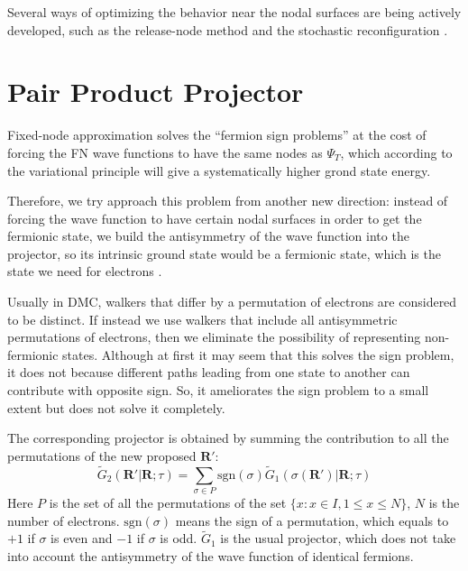 \documentclass[%
reprint,
nofootinbib,
amsmath,amssymb,
aps,
prl,
]{revtex4-1}
\begin{document}
Several ways of optimizing the behavior near the nodal surfaces are being actively developed, such as the release-node method \cite{ceperley1984quantum} and the stochastic reconfiguration \cite{sorella1998green}.

\section{Pair Product Projector}

Fixed-node approximation solves the ``fermion sign problems'' at the cost of forcing the FN wave functions to have the same nodes as $\Psi_T$, which according to the variational principle will give a systematically higher grond state energy.

Therefore, we try approach this problem from another new direction: instead of forcing the wave function to have certain nodal surfaces in order to get the fermionic state, we build the antisymmetry of the wave function into the projector, so its intrinsic ground state would be a fermionic state, which is the state we need for electrons \cite{umrigar2015observations}.

Usually in DMC, walkers that differ by a permutation of electrons are considered to be distinct.  If instead
we use walkers that include all antisymmetric permutations of electrons, then we eliminate the possibility of
representing non-fermionic states.  Although at first it may seem that this solves the sign problem, it does
not because different paths leading from one state to another can contribute with opposite sign.
So, it ameliorates the sign problem to a small extent but does not solve it completely.

The corresponding projector is obtained by summing the contribution to all the permutations of the new proposed $\bm{R'}$:
\begin{equation}
\label{eq:ppp}
\widetilde{G}_2(\bm{R'}|\bm{R};\tau)
= \sum\limits_{\sigma\in P} \mathrm{sgn}(\sigma) \widetilde{G}_1(\sigma(\bm{R'})|\bm{R};\tau)
\end{equation}
Here $P$ is the set of all the permutations of the set $\{x:x \in I, 1 \leq x \leq N\}$, $N$ is the number of electrons.
$\mathrm{sgn}(\sigma)$ means the sign of a permutation, which equals to $+1$ if $\sigma$ is even and $-1$ if $\sigma$ is odd.
$\widetilde{G}_1$ is the usual projector, which does not take into account the antisymmetry of the wave function of identical fermions.
\end{document}

